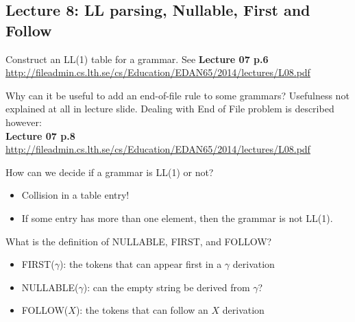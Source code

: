 \documentclass[11pt]{beamer}
\begin{document}
\subsection{Lecture 8: LL parsing, Nullable, First and Follow}
\begin{frame}
\begin{block}{Construct an LL(1) table for a grammar.}
See \textbf{Lecture 07 p.6} \url{http://fileadmin.cs.lth.se/cs/Education/EDAN65/2014/lectures/L08.pdf}
\end{block}

\begin{block}{Why can it be useful to add an end-of-file rule to some grammars?}
Usefulness not explained at all in lecture slide. Dealing with End of File problem is described however:\\ \textbf{Lecture 07 p.8} \url{http://fileadmin.cs.lth.se/cs/Education/EDAN65/2014/lectures/L08.pdf}
\end{block}
\end{frame}

\begin{frame}
\begin{block}{How can we decide if a grammar is LL(1) or not?}
\begin{itemize}
\item Collision in a table entry!
\item If some entry has more than one element, then the grammar is not LL(1).
\end{itemize}
\end{block}

\begin{block}{What is the definition of NULLABLE, FIRST, and FOLLOW?}
\begin{itemize}
\item FIRST($\gamma$): the tokens that can appear first in a $\gamma$ derivation 
\item NULLABLE($\gamma$): can the empty string be derived from $\gamma$? 
\item FOLLOW($X$): the tokens that can follow an $X$ derivation
\end{itemize}
\end{block}
\end{frame}
\end{document}
